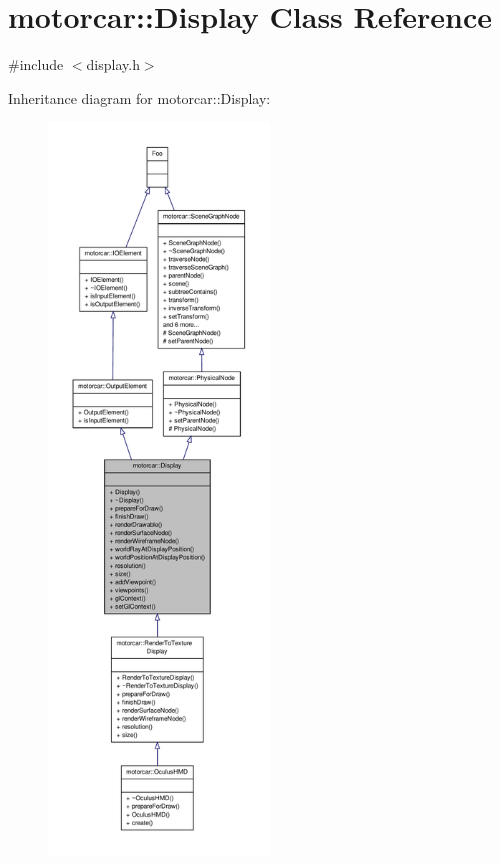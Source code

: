 \hypertarget{classmotorcar_1_1Display}{\section{motorcar\-:\-:Display Class Reference}
\label{classmotorcar_1_1Display}
}


{\ttfamily \#include $<$display.\-h$>$}



Inheritance diagram for motorcar\-:\-:Display\-:
\nopagebreak
\begin{figure}[H]
\begin{center}
\leavevmode
\includegraphics[height=550pt]{classmotorcar_1_1Display__inherit__graph}
\end{center}
\end{figure}


